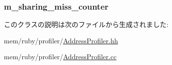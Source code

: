 \label{classAddressProfiler_a5955c6c282623622af31f869827f70eb}
\hypertarget{classAddressProfiler_a20e874443e8d69362f989878d804fde9}{
\subsubsection[{m\_\-sharing\_\-miss\_\-counter}]{ {\bf m\_\-sharing\_\-miss\_\-counter}}}
\label{classAddressProfiler_a20e874443e8d69362f989878d804fde9}


このクラスの説明は次のファイルから生成されました:\begin{DoxyCompactItemize}
\item 
mem/ruby/profiler/\hyperlink{AddressProfiler_8hh}{AddressProfiler.hh}\item 
mem/ruby/profiler/\hyperlink{AddressProfiler_8cc}{AddressProfiler.cc}\end{DoxyCompactItemize}
